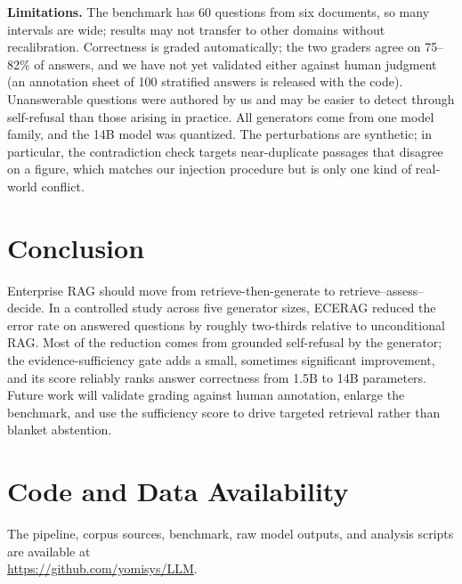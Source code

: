 \documentclass[conference,letterpaper]{IEEEtran}
\begin{document}
\textbf{Limitations.} The benchmark has 60 questions from six documents, so many intervals are
wide; results may not transfer to other domains without recalibration. Correctness is graded
automatically; the two graders agree on 75--82\% of answers, and we have not yet validated either
against human judgment (an annotation sheet of 100 stratified answers is released with the code).
Unanswerable questions were authored by us and may be easier to detect through self-refusal than
those arising in practice. All generators come from one model family, and the 14B model was
quantized. The perturbations are synthetic; in particular, the contradiction check targets
near-duplicate passages that disagree on a figure, which matches our injection procedure but is
only one kind of real-world conflict.

\section{Conclusion}
Enterprise RAG should move from retrieve-then-generate to retrieve--assess--decide. In a
controlled study across five generator sizes, ECERAG reduced the error rate on answered questions
by roughly two-thirds relative to unconditional RAG. Most of the reduction comes from grounded
self-refusal by the generator; the evidence-sufficiency gate adds a small, sometimes significant
improvement, and its score reliably ranks answer correctness from 1.5B to 14B parameters. Future
work will validate grading against human annotation, enlarge the benchmark, and use the
sufficiency score to drive targeted retrieval rather than blanket abstention.

\section*{Code and Data Availability}
The pipeline, corpus sources, benchmark, raw model outputs, and analysis scripts are available
at\\ \url{https://github.com/yomisys/LLM}.

\balance


\end{document}
